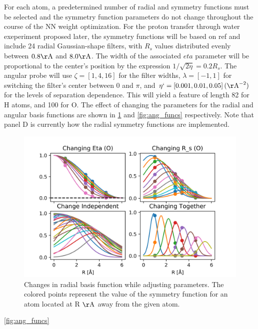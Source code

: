 \documentclass{article}
\begin{document}
For each atom, a predetermined number of radial and symmetry functions must be selected and the symmetry function parameters do not change throughout the course of the NN weight optimization.
 For the proton transfer through water exeperiment proposed later, the symmetry functions will be based on ref and include 24 radial Gaussian-shape filters, with $R_s$ values distributed evenly between $0.8 \mathrm{\AA}$ and $8.0 \mathrm{\AA}$.
 The width of the associated $eta$ parameter will be proportional to the center's position by the expression $1/\sqrt{2\eta} = 0.2 R_s$. The angular probe will use $\zeta = \left[ 1, 4, 16 \right]$ for the filter widths, $\lambda = \left[ -1, 1 \right]$ for switching the filter's center between 0 and $\pi$, and $\eta` = \left[ 0.001, 0.01, 0.05\right] (\mathrm{\AA}^{-2})$ for the levels of separation dependence. This will yield a feature of length 82 for H atoms, and 100 for O. The effect of changing the parameters for the radial and angular basis functions are shown in  \ref{fig:rad_funcs} and \ref{fig:ang_funcs} respectively. Note that panel D is currently how the radial symmetry functions are implemented.
\begin{figure}
	\includegraphics[width=\linewidth]{./img/rad_graphs.png}	\caption{Changes in radial basis function while adjusting parameters. The colored points represent the value of the symmetry function for an atom located at R $\mathrm{\AA}$ away from the given atom.}
	\label{fig:rad_funcs}
\end{figure}
\ref{fig:ang_funcs}
\end{document}
